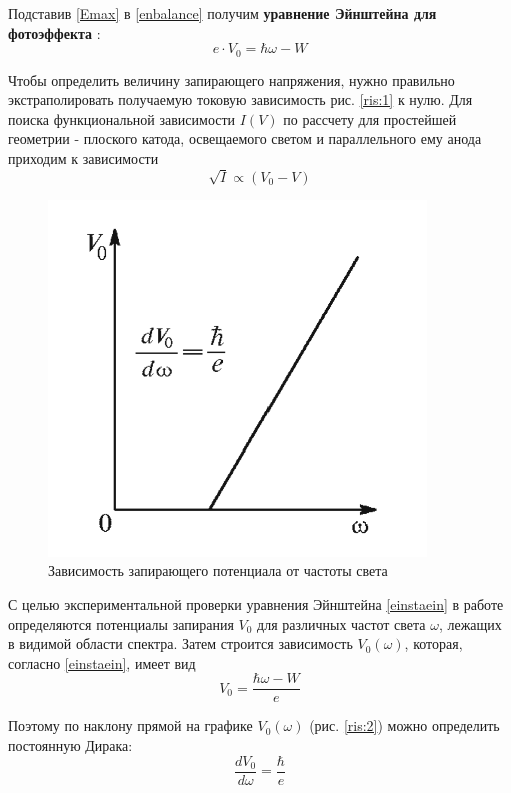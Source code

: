 \documentclass[a4paper,12pt]{article}
\begin{document}
Подставив \eqref{Emax} в \eqref{enbalance} получим \textbf{уравнение Эйнштейна для фотоэффекта} : 
\begin{equation}
    e\cdot V_0 = \hbar \omega - W
    \label{einstaein}
\end{equation}

Чтобы определить величину запирающего напряжения, нужно правильно экстраполировать получаемую токовую зависимость рис. \eqref{ris:1} к нулю. Для поиска функциональной зависимости $I(V)$ по рассчету для простейшей геометрии - плоского катода, освещаемого светом и параллельного ему анода приходим к зависимости 
\begin{equation}
    \sqrt{I} \propto (V_0- V)
    \label{I = V0-V}
\end{equation}

\begin{figure}
\includegraphics[scale = 0.3]{Screenshot 2023-09-08 at 11.04.24 AM.png}
\caption{Зависимость запирающего потенциала от частоты света}
\label{ris:2}
\end{figure}


С целью экспериментальной проверки уравнения Эйнштейна \eqref{einstaein} в работе определяются потенциалы запирания $V_0$ для различных частот света $\omega$, лежащих в видимой области спектра. Затем строится зависимость $V_0(\omega)$, которая, согласно \eqref{einstaein}, имеет вид
\begin{equation}
    V_0 = \frac{\hbar \omega - W}{e}
    \label{V0(w)}
\end{equation}

Поэтому по наклону прямой на графике $V_0(\omega)$ (рис. \eqref{ris:2}) можно определить постоянную Дирака:
\begin{equation}
    \frac{dV_0}{d\omega} = \frac{\hbar}{e}
    \label{def h}
\end{equation}
\end{document}
